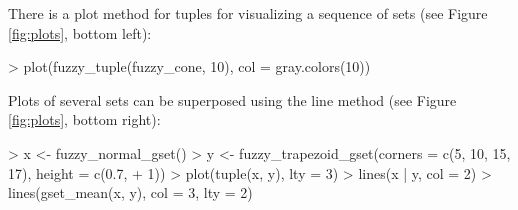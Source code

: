 \documentclass[article]{jss}
\begin{document}
There is a plot method for tuples for visualizing a sequence
of sets (see Figure \ref{fig:plots}, bottom left):
\begin{Schunk}
\begin{Sinput}
> plot(fuzzy_tuple(fuzzy_cone, 10), col = gray.colors(10))
\end{Sinput}
\end{Schunk}
Plots of several sets can be superposed using the line method (see
Figure \ref{fig:plots}, bottom right):
\begin{Schunk}
\begin{Sinput}
> x <- fuzzy_normal_gset()
> y <- fuzzy_trapezoid_gset(corners = c(5, 10, 15, 17), height = c(0.7, 
+     1))
> plot(tuple(x, y), lty = 3)
> lines(x | y, col = 2)
> lines(gset_mean(x, y), col = 3, lty = 2)
\end{Sinput}
\end{Schunk}
\end{document}
